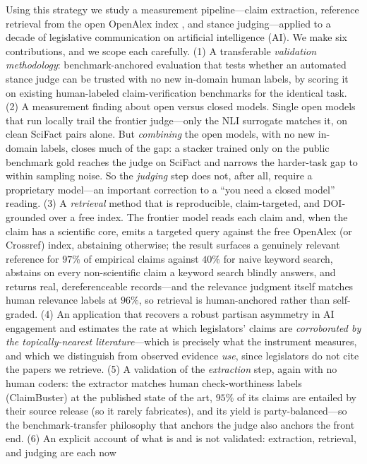 Using this strategy we study a measurement pipeline---claim extraction, reference retrieval from the
open OpenAlex index \citep{priem2022openalex}, and stance judging---applied to a decade of legislative
communication on artificial intelligence (AI). We make six contributions, and we scope each carefully.
(1) A transferable \emph{validation methodology}: benchmark-anchored evaluation that tests whether an
automated stance judge can be trusted with no new in-domain human labels, by scoring it on existing
human-labeled claim-verification benchmarks for the identical task. (2) A measurement finding about open
versus closed models. Single open models that run locally trail the frontier judge---only the
NLI surrogate matches it, on clean SciFact pairs alone. But \emph{combining} the open models, with no new
in-domain labels, closes much of the gap: a stacker trained only on the public benchmark gold reaches the
judge on SciFact and narrows the harder-task gap to within sampling noise. So the \emph{judging} step
does not, after all, require a proprietary model---an important correction to a ``you need a closed
model'' reading. (3) A \emph{retrieval} method that is reproducible, claim-targeted, and DOI-grounded over a
free index. The frontier model reads each claim and, when the claim has a scientific core, emits a targeted
query against the free OpenAlex (or Crossref) index, abstaining otherwise; the result surfaces a genuinely
relevant reference for $97\%$ of empirical claims against $40\%$ for naive keyword search, abstains on every
non-scientific claim a keyword search blindly answers, and returns real, dereferenceable records---and the
relevance judgment itself matches human relevance labels at $96\%$, so retrieval is human-anchored rather
than self-graded. (4) An application that recovers a
robust partisan asymmetry in AI engagement and estimates the rate at which legislators' claims are
\emph{corroborated by the topically-nearest literature}---which is precisely what the instrument
measures, and which we distinguish from observed evidence \emph{use}, since legislators do not cite the
papers we retrieve. (5) A validation of the \emph{extraction} step, again with no human coders: the
extractor matches human check-worthiness labels (ClaimBuster) at the published state of the art, $95\%$
of its claims are entailed by their source release (so it rarely fabricates), and its yield is
party-balanced---so the benchmark-transfer philosophy that anchors the judge also anchors the front end.
(6) An explicit account of what is and is not validated: extraction, retrieval, and judging are each now
